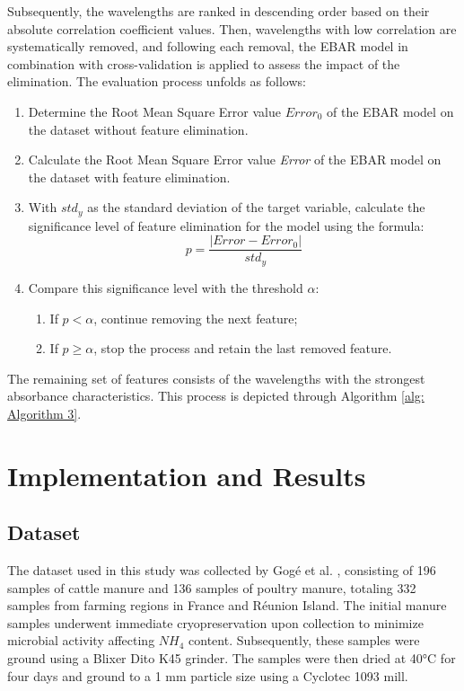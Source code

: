 \documentclass[10pt, a4paper, oneside]{article}
\begin{document}
Subsequently, the wavelengths are ranked in descending order based on their absolute correlation coefficient values. Then, wavelengths with low correlation are systematically removed, and following each removal, the EBAR model in combination with cross-validation is applied to assess the impact of the elimination. The evaluation process unfolds as follows:
\begin{enumerate}
    \item Determine the Root Mean Square Error value \(\textit{Error}_0\) of the EBAR model on the dataset without feature elimination. 
    \item Calculate the Root Mean Square Error value \textit{Error} of the EBAR model on the dataset with feature elimination.
    \item With \(\textit{std}_y\) as the standard deviation of the target variable, calculate the significance level of feature elimination for the model using the formula:
    \[p = \frac{|\textit{Error} - \textit{Error}_0|}{\textit{std}_y}\]
    \item Compare this significance level with the threshold \(\alpha\):
    \begin{enumerate}
        \item If \(p < \alpha\), continue removing the next feature;
        \item If \(p \ge \alpha\), stop the process and retain the last removed feature.
    \end{enumerate}
\end{enumerate}
\hspace{0.5cm} The remaining set of features consists of the wavelengths with the strongest absorbance characteristics. This process is depicted through Algorithm \ref{alg: Algorithm 3}.

\section{Implementation and Results}
\subsection{Dataset}
The dataset used in this study was collected by Gogé et al. \cite{goge2021dataset}, consisting of 196 samples of cattle manure and 136 samples of poultry manure, totaling 332 samples from farming regions in France and Réunion Island. The initial manure samples underwent immediate cryopreservation upon collection to minimize microbial activity affecting \(NH_4\) content. Subsequently, these samples were ground using a Blixer Dito K45 grinder. The samples were then dried at 40°C for four days and ground to a 1 mm particle size using a Cyclotec 1093 mill.
\end{document}
